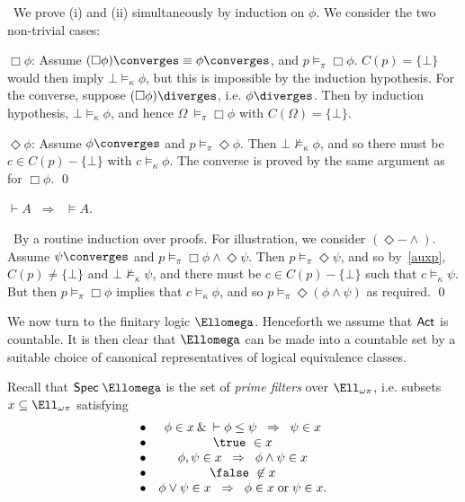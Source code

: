 \proof\ We prove (i) and (ii) simultaneously by induction on $\phi$.
We consider the two non-trivial cases:

\noindent $\Box \phi$: Assume $(\Box \phi )\converges  \equiv  \phi
\converges$, and $p \models_{\pi} \Box \phi$.
$C(p) = \{ \bot \}$ would then imply $\bot \models_{\kappa} \phi$, but
this is impossible by the induction hypothesis.
For the converse, suppose $(\Box \phi ) \diverges$, i.e. $\phi \diverges$.
Then by induction hypothesis, $\bot \models_{\kappa} \phi$, and hence
$\Omega\ \models_{\pi} \Box \phi$ with $C(\Omega ) = \{ \bot \}$.

\noindent $\Diamond \phi$: Assume $\phi \converges$ and $p
\models_{\pi} \Diamond \phi$.
Then $\bot \nvDash_{\kappa} \phi$, and so there must be $c \in C(p) - \{
\bot \}$ with $c \models_{\kappa} \phi$.
The converse is proved by the same argument as for $\Box \phi$. \qed

\begin{theorem}
$\vdash  A \;\; \Longrightarrow \;\; \models  A$.
\end{theorem}

\proof\ By a routine induction over proofs.
For illustration, we consider $({\Diamond}-{\wedge})$.
Assume $\psi \converges$ and $p \models_{\pi} \Box \phi \wedge
\Diamond \psi$.
Then $p \models_{\pi} \Diamond \psi$, and so by~\ref{auxp}, $C(p) \not= \{ \bot
\}$ and $\bot \nvDash_{\kappa} \psi$, and there must be $c \in C(p) - \{
\bot \}$ such that $c \models_{\kappa} \psi$.
But then $p \models_{\pi} \Box \phi$ implies that $c \models_{\kappa}
\phi$, and so $p \models_{\pi} \Diamond ( \phi \wedge \psi )$ as required.
\qed

We now turn to the finitary logic $\Ellomega$.
Henceforth we assume that ${\sf Act}$ is countable.
It is then clear that $\Ellomega$ can be made into a countable set by a
suitable choice of canonical representatives of logical equivalence
classes.

Recall that ${\sf Spec} \; \Ellomega$ is the set of {\em prime filters} over
$\Ell_{\omega \pi}$, i.e. subsets $x \subseteq \Ell_{\omega \pi}$
satisfying
\[ \begin{array}{cc}
\bullet & \phi \in x \: \& \: \vdash  \phi \leq \psi \;\; \Rightarrow \;\;
\psi \in x \\
\bullet & \true\ \in x \\
\bullet & \phi , \psi \in x \;\; \Rightarrow \;\; \phi \wedge \psi \in x \\
\bullet & \false\ \not\in x \\
\bullet & \phi \vee \psi \in x \;\; \Rightarrow \;\; \phi \in x \; \mbox{or}
\; \psi \in x .
\end{array} \]

